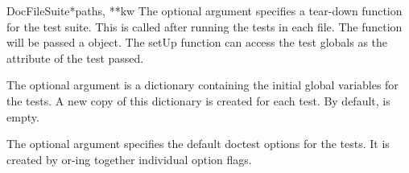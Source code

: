 \begin{funcdesc}{DocFileSuite}{*paths, **kw}
  The optional argument  specifies a tear-down function
  for the test suite.  This is called after running the tests in each
  file.  The  function will be passed a 
  object.  The setUp function can access the test globals as the
   attribute of the test passed.

  The optional argument  is a dictionary containing the
  initial global variables for the tests.  A new copy of this
  dictionary is created for each test.  By default,  is
  empty.

  The optional argument  specifies the default
  doctest options for the tests.  It is created by or-ing together
  individual option flags.

\end{funcdesc}

